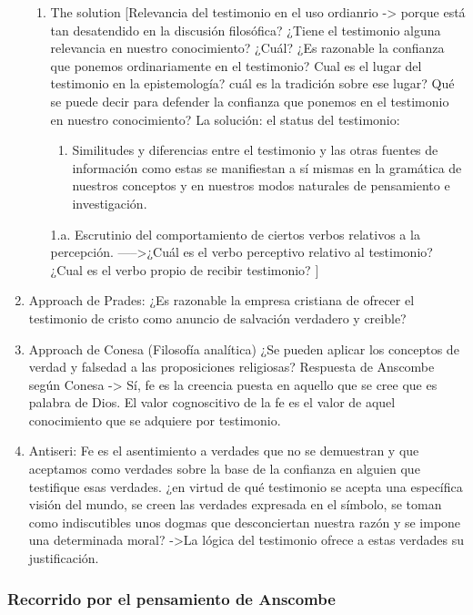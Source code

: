 \documentclass[11pt]{article}
\begin{document}
\begin{enumerate}
\begin{enumerate}
\item The solution
\label{sec-4-1-2-1-2}
[Relevancia del testimonio en el uso ordianrio -> porque está tan desatendido en la discusión filosófica?
¿Tiene el testimonio alguna relevancia en nuestro conocimiento?  ¿Cuál?
¿Es razonable la confianza que ponemos ordinariamente en el testimonio?
Cual es el lugar del testimonio en la epistemología? cuál es la tradición sobre ese lugar?
Qué se puede decir para defender la confianza que ponemos en el testimonio en nuestro conocimiento?
La solución: 
el status del testimonio:
\begin{enumerate}
\item Similitudes y diferencias entre el testimonio y las otras fuentes de información como estas se manifiestan a sí mismas en la gramática de nuestros conceptos y en nuestros modos naturales de pensamiento e investigación.
\end{enumerate}
1.a. Escrutinio del comportamiento de ciertos verbos relativos a la percepción.
----->¿Cuál es el verbo perceptivo relativo al testimonio? ¿Cual es el verbo propio de recibir testimonio?
]
\end{enumerate}

\item Approach de Prades:
\label{sec-4-1-2-2}
¿Es razonable la empresa cristiana de ofrecer el testimonio de cristo como anuncio de salvación verdadero y creible?

\item Approach de Conesa (Filosofía analítica)
\label{sec-4-1-2-3}
¿Se pueden aplicar los conceptos de verdad y falsedad a las proposiciones religiosas?
Respuesta de Anscombe según Conesa
-> Sí, fe es la creencia puesta en aquello que se cree que es palabra de Dios. El valor cognoscitivo de la fe es el valor de aquel conocimiento que se adquiere por testimonio.

\item Antiseri:
\label{sec-4-1-2-4}
Fe es el asentimiento a verdades que no se demuestran y que aceptamos como verdades sobre la base de la confianza en alguien que testifique esas verdades. ¿en virtud de qué testimonio se acepta una específica visión del mundo, se creen las verdades expresada en el símbolo, se toman como indiscutibles unos dogmas que desconciertan nuestra razón y se impone una determinada moral?
->La lógica del testimonio ofrece a estas verdades su justificación.
\end{enumerate}


\subsubsection{Recorrido por el pensamiento de Anscombe}
\label{sec-4-1-3}
\end{document}
